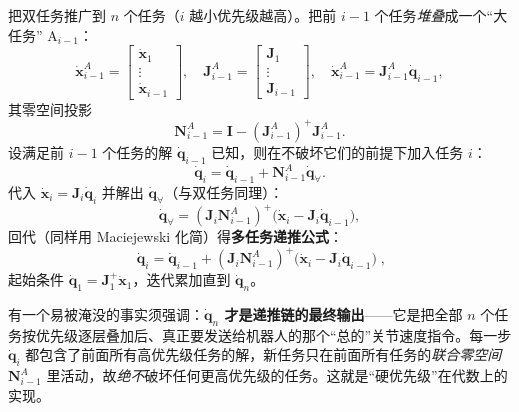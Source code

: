 把双任务推广到 $n$ 个任务（$i$ 越小优先级越高）。把前 $i-1$ 个任务\emph{堆叠}成一个“大任务” $\mathrm{A}_{i-1}$\cite{yu2021quadruped}：
\begin{equation}
  \dot{\boldsymbol{x}}_{i-1}^{A}=\begin{bmatrix}\dot{\boldsymbol{x}}_1\\\vdots\\\dot{\boldsymbol{x}}_{i-1}\end{bmatrix},\quad
  \boldsymbol{J}_{i-1}^{A}=\begin{bmatrix}\boldsymbol{J}_1\\\vdots\\\boldsymbol{J}_{i-1}\end{bmatrix},\quad
  \dot{\boldsymbol{x}}_{i-1}^{A}=\boldsymbol{J}_{i-1}^{A}\dot{\boldsymbol{q}}_{i-1},
  \label{eq:qw-stack}
\end{equation}
其零空间投影
\begin{equation}
  \boldsymbol{N}_{i-1}^{A}=\mathbf{I}-(\boldsymbol{J}_{i-1}^{A})^+\boldsymbol{J}_{i-1}^{A}.
  \label{eq:qw-stack-N}
\end{equation}
设满足前 $i-1$ 个任务的解 $\dot{\boldsymbol{q}}_{i-1}$ 已知，则在不破坏它们的前提下加入任务 $i$：
\begin{equation}
  \dot{\boldsymbol{q}}_i=\dot{\boldsymbol{q}}_{i-1}+\boldsymbol{N}_{i-1}^{A}\dot{\boldsymbol{q}}_{\forall}.
  \label{eq:qw-recur-form}
\end{equation}
代入 $\dot{\boldsymbol{x}}_i=\boldsymbol{J}_i\dot{\boldsymbol{q}}_i$ 并解出 $\dot{\boldsymbol{q}}_{\forall}$（与双任务同理）：
\begin{equation}
  \dot{\boldsymbol{q}}_{\forall}=(\boldsymbol{J}_i\boldsymbol{N}_{i-1}^{A})^+\big(\dot{\boldsymbol{x}}_i-\boldsymbol{J}_i\dot{\boldsymbol{q}}_{i-1}\big),
  \label{eq:qw-recur-qfree}
\end{equation}
回代（同样用 Maciejewski 化简）得\textbf{多任务递推公式}\cite{yu2021quadruped,maciejewski1985obstacle}：
\begin{equation}
  \boxed{\;\dot{\boldsymbol{q}}_i=\dot{\boldsymbol{q}}_{i-1}+(\boldsymbol{J}_i\boldsymbol{N}_{i-1}^{A})^+\big(\dot{\boldsymbol{x}}_i-\boldsymbol{J}_i\dot{\boldsymbol{q}}_{i-1}\big)\;},
  \label{eq:qw-recur}
\end{equation}
起始条件 $\dot{\boldsymbol{q}}_1=\boldsymbol{J}_1^+\dot{\boldsymbol{x}}_1$，迭代累加直到 $\dot{\boldsymbol{q}}_n$。

\begin{insight}[递推链的最终输出 $=$ 发给机器人的总指令]\label{ins:qw-final-output}
有一个易被淹没的事实须强调：\textbf{$\dot{\boldsymbol{q}}_n$ 才是递推链的最终输出}——它是把全部 $n$ 个任务按优先级逐层叠加后、真正要发送给机器人的那个“总的”关节速度指令。每一步 $\dot{\boldsymbol{q}}_i$ 都包含了前面所有高优先级任务的解，新任务只在前面所有任务的\emph{联合零空间} $\boldsymbol{N}_{i-1}^A$ 里活动，故\emph{绝不}破坏任何更高优先级的任务。这就是“硬优先级”在代数上的实现。
\end{insight}

